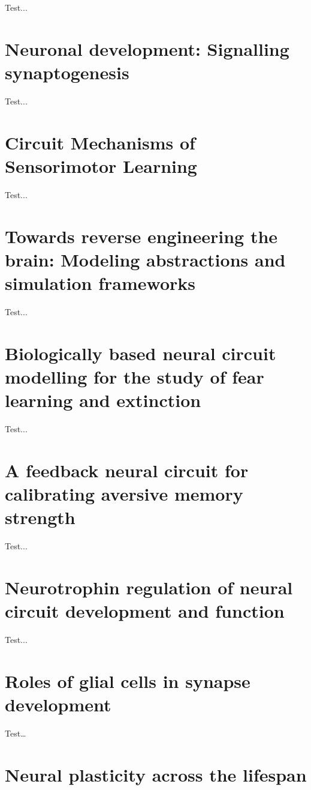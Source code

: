 \documentclass[11pt, a4paper, oneside]{article}   	%
\begin{document}
Test...

\section{Neuronal development: Signalling synaptogenesis \cite{Lewis2016}}

Test...

\section{Circuit Mechanisms of Sensorimotor Learning \cite{Makino2016}}

Test...

\section{Towards reverse engineering the brain: Modeling abstractions and simulation frameworks \cite{Nageswaran2010}}

Test...

\section{Biologically based neural circuit modelling for the study of fear learning and extinction \cite{Nair2016}}

Test...

\section{A feedback neural circuit for calibrating aversive memory strength \cite{Ozawa2016}}

Test...

\section{Neurotrophin regulation of neural circuit development and function \cite{Park2013}}

Test...

\section{Roles of glial cells in synapse development \cite{frieger2009}}

Test\ldots

\section{Neural plasticity across the lifespan \cite{Power2016}}
\end{document}
